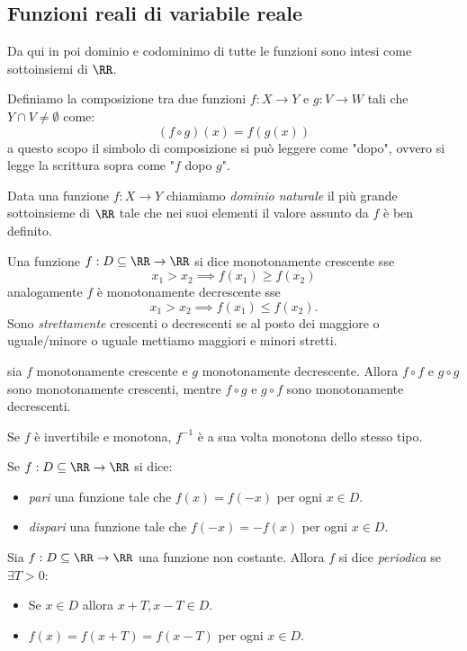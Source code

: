 \documentclass[11pt]{scrartcl}
\begin{document}
	\subsection{Funzioni reali di variabile reale}
	Da qui in poi dominio e codominimo di tutte le funzioni sono intesi come sottoinsiemi di $\RR$.
	\begin{definition}[Composizione]
		Definiamo la composizione tra due funzioni $f:X\to Y$ e $g:V\to W$ tali che $Y\cap V\ne \emptyset$ come:
		$$( f\circ g )(x)=f(g(x))$$
		a questo scopo il simbolo di composizione si può leggere come "dopo", ovvero si legge la scrittura sopra come "$f$ dopo $g$".
	\end{definition}
	\begin{definition}
		Data una funzione $f:X\to Y$ chiamiamo \textit{dominio naturale} il più grande sottoinsieme di $\RR$ tale che nei suoi elementi il valore assunto da $f$ è ben definito.
	\end{definition}
	\begin{definition}[Monotonicità]
		Una funzione $f:D\subseteq\RR \to \RR$ si dice monotonamente crescente sse
		$$x_1>x_2 \implies f(x_1)\ge f(x_2)$$
		analogamente $f$ è monotonamente decrescente sse
		$$x_1>x_2 \implies f(x_1)\le f(x_2).$$
		Sono \textit{strettamente} crescenti o decrescenti se al posto dei maggiore o uguale/minore o uguale mettiamo maggiori e minori stretti. 
	\end{definition}
	\begin{lemma}
		sia $f$ monotonamente crescente e $g$ monotonamente decrescente. Allora $f\circ f$ e $g\circ g$ sono monotonamente crescenti, mentre $f\circ g$ e $g\circ f$ sono monotonamente decrescenti.
	\end{lemma}
	\begin{lemma}
		Se $f$ è invertibile e monotona, $f^{-1}$ è a sua volta monotona dello stesso tipo.
	\end{lemma}
	\begin{definition}
		Se $f:D\subseteq \RR \to \RR$ si dice:
		\begin{itemize}
			\item \textit{pari} una funzione tale che $f(x)=f(-x)$ per ogni $x\in D$.
			\item \textit{dispari} una funzione tale che $f(-x)=-f(x)$ per ogni $x\in D$.
		\end{itemize}
	\end{definition}
	\begin{definition}
		Sia $f:D\subseteq\RR\to\RR$ una funzione non costante. Allora $f$ si dice \textit{periodica} se $\exists T>0$:
		\begin{itemize}
			\item Se $x\in D$ allora $x+ T,x-T\in D$.
			\item $f(x)=f(x+T)=f(x-T)$ per ogni $x\in D$.
		\end{itemize}
	\end{definition}
\end{document}
